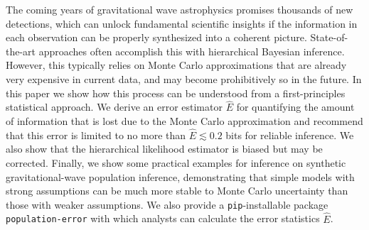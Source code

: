 \begin{refsection}
\begin{chapterabstract}
The coming years of gravitational wave astrophysics promises thousands of new detections, which can unlock fundamental scientific insights if the information in each observation can be properly synthesized into a coherent picture. State-of-the-art approaches often accomplish this with hierarchical Bayesian inference. However, this typically relies on Monte Carlo approximations that are already very expensive in current data, and may become prohibitively so in the future. In this paper we show how this process can be understood from a first-principles statistical approach. We derive an error estimator $\hat{E}$ for quantifying the amount of information that is lost due to the Monte Carlo approximation and recommend that this error is limited to no more than $\hat{E} \lesssim 0.2$ bits for reliable inference. We also show that the hierarchical likelihood estimator is biased but may be corrected. Finally, we show some practical examples for inference on synthetic gravitational-wave population inference, demonstrating that simple models with strong assumptions can be much more stable to Monte Carlo uncertainty than those with weaker assumptions. We also provide a \texttt{pip}-installable package \texttt{population-error} with which analysts can calculate the error statistics $\hat{E}$.
\end{chapterabstract}








\begin{subappendices}





\end{subappendices}

\printbibliography[heading=subbibliography]
\end{refsection}

